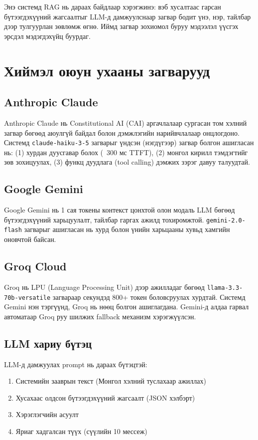 \documentclass[12pt,a4paper]{report}
\begin{document}
Энэ системд RAG нь дараах байдлаар хэрэгжинэ: вэб хусалтаас гарсан бүтээгдэхүүний жагсаалтыг LLM-д дамжуулснаар загвар бодит үнэ, нэр, тайлбар дээр тулгуурлан зөвлөмж өгнө. Иймд загвар зохиомол буруу мэдээлэл үүсгэх эрсдэл мэдэгдэхүйц буурдаг.

\section{Хиймэл оюун ухааны загварууд}

\subsection{Anthropic Claude}

Anthropic Claude \cite{anthropic2024} нь Constitutional AI (CAI) аргачлалаар сургасан том хэлний загвар бөгөөд аюулгүй байдал болон дэмжлэгийн нарийвчлалаар онцлогдоно. Системд \texttt{claude-haiku-3-5} загварыг үндсэн (нэгдүгээр) загвар болгон ашигласан нь: (1) хурдан дуусгавар болох (~300 мс TTFT), (2) монгол кирилл тэмдэгтийг зөв зохицуулах, (3) функц дуудлага (tool calling) дэмжих зэрэг давуу талуудтай.

\subsection{Google Gemini}

Google Gemini \cite{gemini} нь 1 сая токены контекст цонхтой олон модаль LLM бөгөөд бүтээгдэхүүний харьцуулалт, тайлбар гаргах ажилд тохиромжтой. \texttt{gemini-2.0-flash} загварыг ашигласан нь хурд болон үнийн харьцааны хувьд хамгийн оновчтой байсан.

\subsection{Groq Cloud}

Groq \cite{groqDocs} нь LPU (Language Processing Unit) дээр ажилладаг бөгөөд \texttt{llama-3.3-70b-versatile} загвараар секундэд 800+ токен боловсруулах хурдтай. Системд Gemini нэн тэргүүнд, Groq нь нөөц болгон ашиглагдана. Gemini-д алдаа гарвал автоматаар Groq руу шилжих fallback механизм хэрэгжүүлсэн.

\subsection{LLM хариу бүтэц}

LLM-д дамжуулах prompt нь дараах бүтэцтэй:
\begin{enumerate}[leftmargin=1.5cm]
  \item Системийн зааврын текст (Монгол хэлний туслахаар ажиллах)
  \item Хусахаас олдсон бүтээгдэхүүний жагсаалт (JSON хэлбэрт)
  \item Хэрэглэгчийн асуулт
  \item Яриаг хадгалсан түүх (сүүлийн 10 мессеж)
\end{enumerate}
\end{document}
